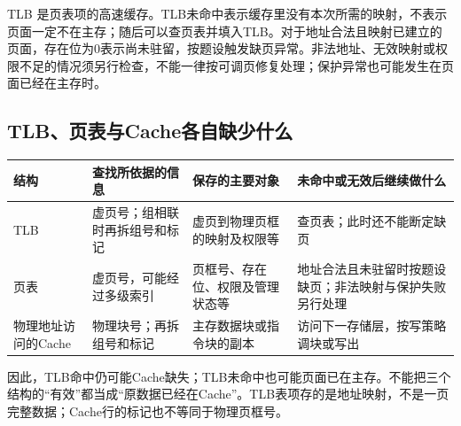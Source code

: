 TLB 是页表项的高速缓存。TLB未命中表示缓存里没有本次所需的映射，不表示页面一定不在主存；随后可以查页表并填入TLB。对于地址合法且映射已建立的页面，存在位为0表示尚未驻留，按题设触发缺页异常。非法地址、无效映射或权限不足的情况须另行检查，不能一律按可调页修复处理；保护异常也可能发生在页面已经在主存时。

\subsection{TLB、页表与Cache各自缺少什么}\label{CO03-24}

\begin{wideblock}\par\medskip\noindent\begin{minipage}{\linewidth}\fontsize{9.3}{12}\selectfont\begin{tabularx}{\linewidth}{@{}YYYY@{}}
\toprule\noalign{}
\begin{minipage}[b]{\linewidth}\raggedright
结构
\end{minipage} & \begin{minipage}[b]{\linewidth}\raggedright
查找所依据的信息
\end{minipage} & \begin{minipage}[b]{\linewidth}\raggedright
保存的主要对象
\end{minipage} & \begin{minipage}[b]{\linewidth}\raggedright
未命中或无效后继续做什么
\end{minipage} \\
\midrule\noalign{}


TLB & 虚页号；组相联时再拆组号和标记 & 虚页到物理页框的映射及权限等 & 查页表；此时还不能断定缺页 \\
页表 & 虚页号，可能经过多级索引 & 页框号、存在位、权限及管理状态等 & 地址合法且未驻留时按题设缺页；非法映射与保护失败另行处理 \\
物理地址访问的Cache & 物理块号；再拆组号和标记 & 主存数据块或指令块的副本 & 访问下一存储层，按写策略调块或写出 \\
\bottomrule\end{tabularx}
\end{minipage}\par\medskip\end{wideblock}

因此，TLB命中仍可能Cache缺失；TLB未命中也可能页面已在主存。不能把三个结构的``有效''都当成``原数据已经在Cache''。TLB表项存的是地址映射，不是一页完整数据；Cache行的标记也不等同于物理页框号。

